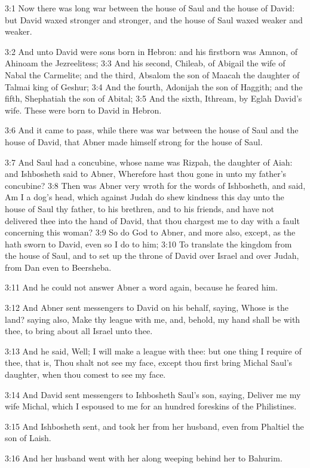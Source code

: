 3:1 Now there was long war between the house of Saul and the house of David: but David waxed stronger and stronger, and the house of Saul waxed weaker and weaker.

3:2 And unto David were sons born in Hebron: and his firstborn was Amnon, of Ahinoam the Jezreelitess; 3:3 And his second, Chileab, of Abigail the wife of Nabal the Carmelite; and the third, Absalom the son of Maacah the daughter of Talmai king of Geshur; 3:4 And the fourth, Adonijah the son of Haggith; and the fifth, Shephatiah the son of Abital; 3:5 And the sixth, Ithream, by Eglah David's wife. These were born to David in Hebron.

3:6 And it came to pass, while there was war between the house of Saul and the house of David, that Abner made himself strong for the house of Saul.

3:7 And Saul had a concubine, whose name was Rizpah, the daughter of Aiah: and Ishbosheth said to Abner, Wherefore hast thou gone in unto my father's concubine?  3:8 Then was Abner very wroth for the words of Ishbosheth, and said, Am I a dog's head, which against Judah do shew kindness this day unto the house of Saul thy father, to his brethren, and to his friends, and have not delivered thee into the hand of David, that thou chargest me to day with a fault concerning this woman?  3:9 So do God to Abner, and more also, except, as the \LORD hath sworn to David, even so I do to him; 3:10 To translate the kingdom from the house of Saul, and to set up the throne of David over Israel and over Judah, from Dan even to Beersheba.

3:11 And he could not answer Abner a word again, because he feared him.

3:12 And Abner sent messengers to David on his behalf, saying, Whose is the land? saying also, Make thy league with me, and, behold, my hand shall be with thee, to bring about all Israel unto thee.

3:13 And he said, Well; I will make a league with thee: but one thing I require of thee, that is, Thou shalt not see my face, except thou first bring Michal Saul's daughter, when thou comest to see my face.

3:14 And David sent messengers to Ishbosheth Saul's son, saying, Deliver me my wife Michal, which I espoused to me for an hundred foreskins of the Philistines.

3:15 And Ishbosheth sent, and took her from her husband, even from Phaltiel the son of Laish.

3:16 And her husband went with her along weeping behind her to Bahurim.

